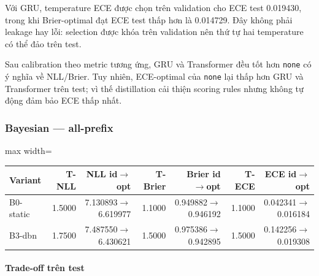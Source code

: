 Với GRU, temperature ECE được chọn trên validation cho ECE test 0.019430, trong khi Brier-optimal đạt ECE test thấp hơn là 0.014729. Đây không phải leakage hay lỗi: selection được khóa trên validation nên thứ tự hai temperature có thể đảo trên test.

Sau calibration theo metric tương ứng, GRU và Transformer đều tốt hơn \texttt{none} có ý nghĩa về NLL/Brier. Tuy nhiên, ECE-optimal của \texttt{none} lại thấp hơn GRU và Transformer trên test; vì thế distillation cải thiện scoring rules nhưng không tự động đảm bảo ECE thấp nhất.

\subsubsection*{Bayesian --- all-prefix}

\begin{table}[!htbp]
\centering
\scriptsize
\setlength{\tabcolsep}{2.5pt}
\begin{adjustbox}{max width=\textwidth}
\begin{tabular}{@{}lrrrrrr@{}}
\toprule
Variant & T-NLL & NLL id$\rightarrow$opt & T-Brier & Brier id$\rightarrow$opt & T-ECE & ECE id$\rightarrow$opt \\
\midrule
B0-static & 1.5000 & 7.130893$\rightarrow$6.619977 & 1.1000 & 0.949882$\rightarrow$0.946192 & 1.1000 & 0.042341$\rightarrow$0.016184 \\
B3-dbn & 1.7500 & 7.487550$\rightarrow$6.430621 & 1.5000 & 0.975386$\rightarrow$0.942895 & 1.5000 & 0.142256$\rightarrow$0.019308 \\
\bottomrule
\end{tabular}
\end{adjustbox}
\end{table}

\paragraph{Trade-off trên test}

